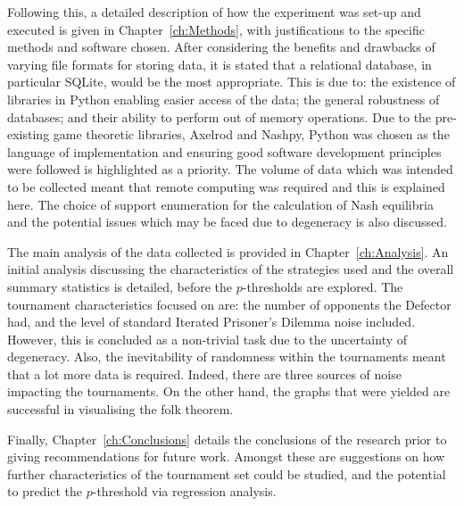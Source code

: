 Following this, a detailed description of how the experiment was set-up and
executed is given in Chapter~\ref{ch:Methods}, with justifications to the specific methods and software
chosen. After considering the benefits and drawbacks of varying file formats for
storing data, it is stated that a relational database, in particular SQLite,
would be the most appropriate. This is due to: the existence of libraries in
Python enabling easier access of the data; the general robustness of
databases; and their ability to perform out of memory operations. Due to the
pre-existing game theoretic libraries, Axelrod and Nashpy, Python was chosen as
the language of implementation and ensuring good software development principles
were followed is highlighted as a priority. The volume of data which was intended
to be collected meant that remote computing was required and this is explained here. The choice of support enumeration for the calculation of
Nash equilibria and the potential issues which may be faced due to degeneracy is
also discussed.

The main analysis of the data collected is provided in Chapter~\ref{ch:Analysis}. An initial analysis discussing the characteristics of
the strategies used and the overall summary statistics is detailed, before the
\(p\)-thresholds are explored. The tournament characteristics focused on
are: the number of opponents the Defector had, and the level of standard
Iterated Prisoner's Dilemma noise
included. However, this is concluded as a non-trivial task due to the
uncertainty of degeneracy.
Also, the inevitability of randomness within the tournaments meant that a lot
more data is required. Indeed, there are three sources of
noise impacting the tournaments. On the other hand, the graphs that
were yielded are successful in visualising the folk theorem.

Finally, Chapter~\ref{ch:Conclusions} details the
conclusions of the research prior to giving recommendations for future work.
Amongst these are suggestions on how further characteristics of the tournament
set could be studied, and the potential to predict the \(p\)-threshold via regression analysis.